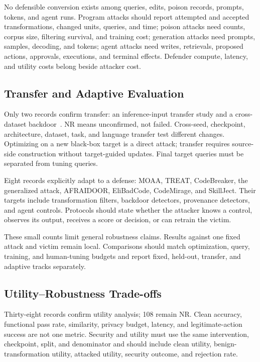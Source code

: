 \documentclass[acmsmall,screen,review]{acmart}
\begin{document}
No defensible conversion exists among queries, edits, poison records, prompts, tokens, and agent runs. Program attacks should report attempted and accepted transformations, changed units, queries, and time; poison attacks need counts, corpus size, filtering survival, and training cost; generation attacks need prompts, samples, decoding, and tokens; agent attacks need writes, retrievals, proposed actions, approvals, executions, and terminal effects. Defender compute, latency, and utility costs belong beside attacker cost.

\subsection{Transfer and Adaptive Evaluation}
Only two records confirm transfer: an inference-input transfer study and a cross-dataset backdoor~\cite{transfer2024coding,transferable2026backdoor}. \textsf{NR} means unconfirmed, not failed. Cross-seed, checkpoint, architecture, dataset, task, and language transfer test different changes. Optimizing on a new black-box target is a direct attack; transfer requires source-side construction without target-guided updates. Final target queries must be separated from tuning queries.

Eight records explicitly adapt to a defense: MOAA, TREAT, CodeBreaker, the generalized attack, AFRAIDOOR, EliBadCode, CodeMirage, and SkillJect. Their targets include transformation filters, backdoor detectors, provenance detectors, and agent controls. Protocols should state whether the attacker knows a control, observes its output, receives a score or decision, or can retrain the victim.

These small counts limit general robustness claims. Results against one fixed attack and victim remain local. Comparisons should match optimization, query, training, and human-tuning budgets and report fixed, held-out, transfer, and adaptive tracks separately.

\subsection{Utility--Robustness Trade-offs}
Thirty-eight records confirm utility analysis; 108 remain \textsf{NR}. Clean accuracy, functional pass rate, similarity, privacy budget, latency, and legitimate-action success are not one metric. Security and utility must use the same intervention, checkpoint, split, and denominator and should include clean utility, benign-transformation utility, attacked utility, security outcome, and rejection rate.
\end{document}
